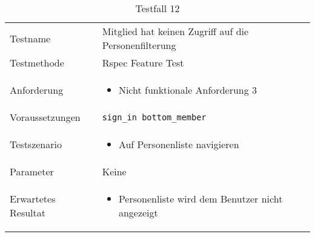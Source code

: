 \begin{table}[h!]
   \begin{tabular}{|L{0.4\textwidth}|L{0.6\textwidth}|}
       \hline
         \\[12pt]
       \hline
        Testname & Mitglied hat keinen Zugriff auf die Personenfilterung \\
       \hline
       Testmethode & Rspec Feature Test \\
       \hline
        Anforderung & 
        \begin{itemize}
         \item Nicht funktionale Anforderung 3
         \end{itemize}  \\
       \hline
       Voraussetzungen & \texttt{sign\_in bottom\_member} \\
       \hline
       Testszenario & 
       \begin{itemize}
         \item Auf Personenliste navigieren
       \end{itemize} \\
       \hline
       Parameter & Keine \\
       \hline
       Erwartetes Resultat & 
       \begin{itemize}
         \item Personenliste wird dem Benutzer nicht angezeigt
       \end{itemize} \\
     \hline
     \end{tabular}
     \caption{Testfall 12}
\end{table}

\newpage

